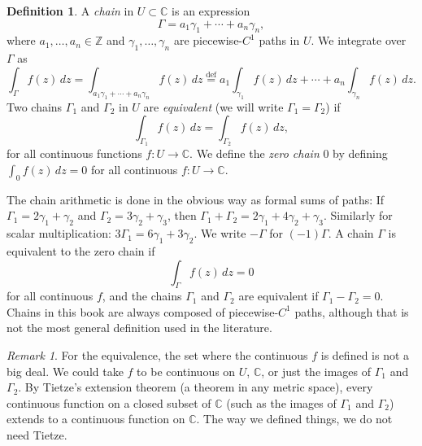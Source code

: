 \documentclass[12pt,openany]{book}
\newcommand{\C}{{\mathbb{C}}}
\newcommand{\Z}{{\mathbb{Z}}}
\newcommand{\myindex}[1]{#1\index{#1}}
\theoremstyle{plain}
\theoremstyle{remark}
\newtheorem{remark}[thm]{Remark}
\theoremstyle{definition}
\newtheorem{defn}[thm]{Definition}
\theoremstyle{exercise}
\theoremstyle{example}
\begin{document}
\begin{defn}
A \emph{\myindex{chain}} in $U \subset \C$ is an expression
\begin{equation*}
\Gamma = a_1 \gamma_1 + \cdots + a_n \gamma_n ,
\end{equation*}
where $a_1,\ldots,a_n \in \Z$ and $\gamma_1,\ldots,\gamma_n$
are piecewise-$C^1$ paths in $U$.  We integrate over $\Gamma$ as
%
\begin{equation*}
\int_{\Gamma} f(z) \, dz
=
\int_{a_1 \gamma_1 + \cdots + a_n \gamma_n} f(z) \, dz
\overset{\text{def}}{=}
a_1 \int_{\gamma_1} f(z) \, dz +
\cdots
+
a_n \int_{\gamma_n} f(z) \, dz .
\end{equation*}
Two chains $\Gamma_1$ and $\Gamma_2$ in 
$U$ are
\emph{equivalent} (we will write
%
$\Gamma_1=\Gamma_2$) if
\begin{equation*}
\int_{\Gamma_1} f(z) \, dz = 
\int_{\Gamma_2} f(z) \, dz ,
\end{equation*}
for all continuous functions $f \colon U \to \C$.
We define the \emph{\myindex{zero chain}} $0$ by defining 
$\int_0 f(z) \, dz = 0$ for all continuous $f \colon U \to \C$.
\end{defn}

The chain arithmetic is done in the obvious way as formal sums of paths:
If $\Gamma_1 = 2 \gamma_1 + \gamma_2$ and $\Gamma_2 = 3 \gamma_2 +
\gamma_3$, then $\Gamma_1 + \Gamma_2 = 2 \gamma_1 + 4 \gamma_2 + \gamma_3$.
Similarly for scalar multiplication: $3 \Gamma_1 = 6 \gamma_1 + 3 \gamma_2$.
%
We write $-\Gamma$ for $(-1)\Gamma$.
A chain $\Gamma$ is equivalent to the zero chain if
\begin{equation*}
\int_\Gamma f(z)\, dz = 0
\end{equation*}
for all continuous $f$, and
the chains $\Gamma_1$ and $\Gamma_2$ are equivalent if $\Gamma_1 - \Gamma_2 = 0$.
Chains in this book are always composed of piecewise-$C^1$ paths,
although that is not the most general definition used in the literature.

\begin{remark}
For the equivalence,
the set where the continuous $f$ is defined is not a big deal.  We could
take $f$ to be continuous on $U$, $\C$, or just the images of
$\Gamma_1$ and $\Gamma_2$.
By Tietze's extension theorem (a theorem in any metric space),
every continuous function on a closed subset of
$\C$ (such as the images of $\Gamma_1$ and $\Gamma_2$) extends to a
continuous function on $\C$.
The way we defined things, we do not need Tietze.
\end{remark}
\end{document}
